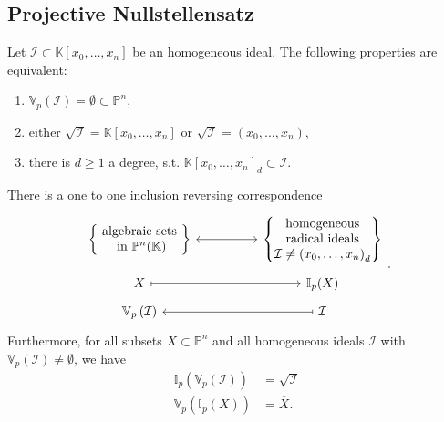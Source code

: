 \subsection{Projective Nullstellensatz}
\begin{lem}
	Let $\mathcal{I} \subset \mathbb{K}\left[x_0, \ldots, x_n \right]$ be an homogeneous ideal.
	The following properties are equivalent:
	\begin{enumerate}
		\item $\mathbb{V}_p\left( \mathcal{I} \right) = \emptyset \subset \mathbb{P}^{n}$,
		\item either $\sqrt{\mathcal{I}} = \mathbb{K}\left[x_0, \ldots, x_n \right]$ or $\sqrt{\mathcal{I}} = \left( x_0, \ldots, x_n \right)$,
		\item there is $d \geq 1$ a degree, s.t. $\mathbb{K}\left[x_0, \ldots, x_n \right]_d \subset \mathcal{I}$.
	\end{enumerate}
\end{lem} 

\begin{thm}\leavevmode\vspace{-.1\baselineskip}\newline There is a one to one inclusion reversing correspondence
	\begin{equation}
	\begin{tikzcd}[row sep=tiny]
			\left\{\begin{matrix}
				\text{ algebraic sets }\\
				\text{ in } \mathbb{P}^{n}(\K)
			\end{matrix}\right\} \arrow[rr, "", leftrightarrow] & &
			\left\{  \begin{matrix}
				\text{ homogeneous }\\
				\text{ radical ideals }\\
				\mathcal{I} \neq \left( x_0, \ldots, x_n \right)_d
			\end{matrix}\right\} \\
			X \arrow[rr, "", rightarrow, maps to] & & \mathbb{I}_p(X)\\
			\mathbb{V}_p\left( \mathcal{I} \right) & & \mathcal{I} \arrow[ll, "", rightarrow, maps to]
	\end{tikzcd}
	.\end{equation} 
	Furthermore, for all subsets $X \subset \mathbb{P}^{n}$ and all homogeneous ideals $\mathcal{I}$ with $\mathbb{V}_p\left( \mathcal{I} \right) \neq \emptyset$, we have
	\begin{align}
		\mathbb{I}_p \left( \mathbb{V}_p\left( \mathcal{I} \right) \right) &= \sqrt{\mathcal{I}}\\
		\mathbb{V}_p\left( \mathbb{I}_p(X) \right) &= \overline{X}
	.\end{align} 
\end{thm}

